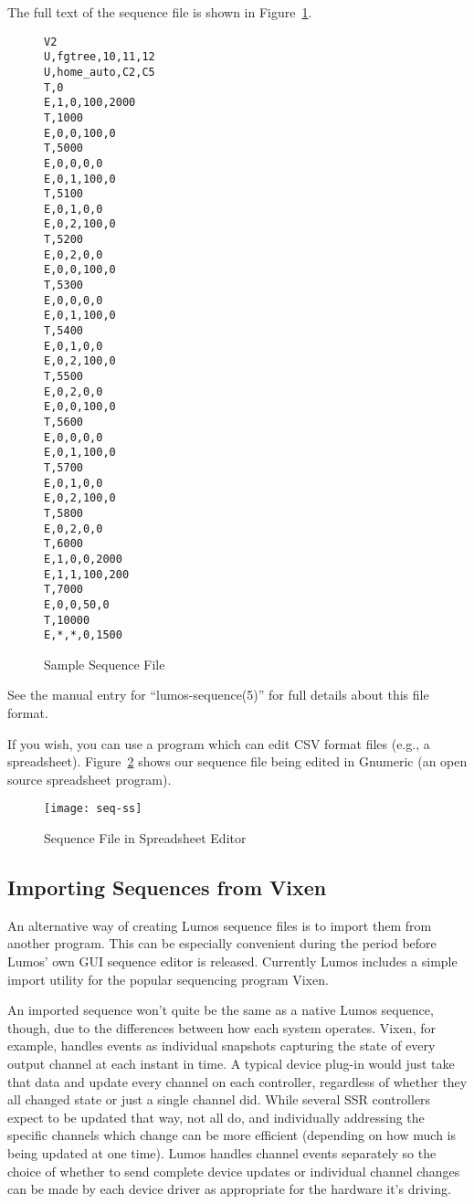 \documentclass{article}
\begin{document}
The full text of the sequence file is shown in Figure~\ref{seq:all}.

\begin{figure}[p]
\begin{verbatim}
V2
U,fgtree,10,11,12
U,home_auto,C2,C5
T,0
E,1,0,100,2000
T,1000
E,0,0,100,0
T,5000
E,0,0,0,0
E,0,1,100,0
T,5100
E,0,1,0,0
E,0,2,100,0
T,5200
E,0,2,0,0
E,0,0,100,0
T,5300
E,0,0,0,0
E,0,1,100,0
T,5400
E,0,1,0,0
E,0,2,100,0
T,5500
E,0,2,0,0
E,0,0,100,0
T,5600
E,0,0,0,0
E,0,1,100,0
T,5700
E,0,1,0,0
E,0,2,100,0
T,5800
E,0,2,0,0
T,6000
E,1,0,0,2000
E,1,1,100,200
T,7000
E,0,0,50,0
T,10000
E,*,*,0,1500
\end{verbatim}
\caption{Sample Sequence File}
\label{seq:all}
\end{figure}

See the manual entry for ``lumos-sequence(5)'' for full details about this
file format.

If you wish, you can use a program which can edit CSV format files (e.g., a
spreadsheet).  Figure~\ref{seq:ss} shows our sequence file being edited in
Gnumeric (an open source spreadsheet program).

\begin{figure}[p]
\texttt{[image: seq-ss]}
\caption{Sequence File in Spreadsheet Editor}
\label{seq:ss}
\end{figure}

\subsection{Importing Sequences from Vixen}
An alternative way of creating Lumos sequence files is to import them from
another program.  This can be especially convenient during the period before
Lumos' own GUI sequence editor is released.  Currently Lumos includes a simple 
import utility for the popular sequencing program Vixen.  

An imported sequence won't quite be the same as a native Lumos sequence,
though, due to the differences between how each system operates.  
Vixen, for example, handles events as individual snapshots capturing the state of every output channel at each instant in time. A typical device plug-in would just take that data and update every channel on each controller, regardless of whether they all changed state or just a single channel did. While several SSR controllers expect to be updated that way, not all do, and individually addressing the specific channels which change can be more efficient (depending on how much is being updated at one time). Lumos handles channel events separately so the choice of whether to send complete device updates or individual channel changes can be made by each device driver as appropriate for the hardware it's driving.
\end{document}
